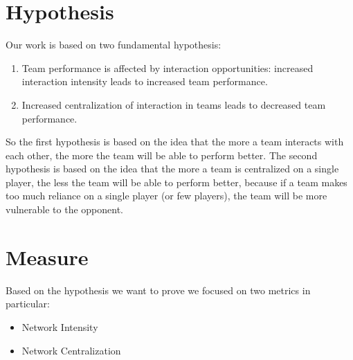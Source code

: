 \documentclass[12pt, a4paper]{article}
\begin{document}


\section{Hypothesis}
Our work is based on two fundamental hypothesis:
\begin{enumerate}
        \item Team performance is affected by interaction opportunities: increased interaction intensity leads to increased team performance.
        \item Increased centralization of interaction in teams leads to decreased team performance.
\end{enumerate}
So the first hypothesis is based on the idea that the more a team interacts with each other, the more the team will be able to perform better. The second hypothesis is based on the idea that the more a team is centralized on a single player, the less the team will be able to perform better, because if a team makes too much reliance on a single player (or few players), the team will be more vulnerable to the opponent. 
\section{Measure}
\label{measures}
Based on the hypothesis we want to prove we focused on two metrics in particular:
\begin{itemize}
        \item Network Intensity
        \item Network Centralization
\end{itemize}
\end{document}
